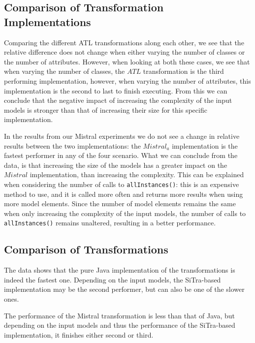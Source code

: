 \documentclass[12pt]{elsarticle}
\begin{document}
\subsection{Comparison of Transformation Implementations}

Comparing the different ATL transformations along each other, we see that the
relative difference does not change when either varying the number of classes
or the number of attributes. However, when looking at both these cases, we see
that when varying the number of classes, the $ATL$ transformation is the
third performing implementation, however, when varying the number of attributes,
this implementation is the second to last to finish executing. From this we can
conclude that the negative impact of increasing the complexity of the input
models is stronger than that of increasing their size for this specific
implementation.

In the results from our Mistral experiments we do not see a change in relative
results between the two implementations: the $Mistral_a$ implementation is the
fastest performer in any of the four scenario. What we can conclude from the
data, is that increasing the size of the models has a greater impact on the
$Mistral$ implementation, than increasing the complexity. This can be
explained when considering the number of calls to \texttt{allInstances()}: this is an
expensive method to use, and it is called more often and returns more results
when using more model elements. Since the number of model elements remains the
same when only increasing the complexity of the input models, the number of
calls to \texttt{allInstances()} remains unaltered, resulting in a better performance.


\subsection{Comparison of Transformations}

The data shows that the pure Java implementation of the transformations is
indeed the fastest one. Depending on the input models, the SiTra-based
implementation may be the second performer, but can also be one of the slower
ones.

The performance of the Mistral transformation is less than that of Java, but
depending on the input models and thus the performance of the SiTra-based
implementation, it finishes either second or third.
\end{document}
